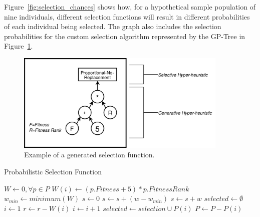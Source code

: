 \documentclass[times,12pt,titlepage]{mstogs}
\begin{document}
\begin{ThesisBody}
Figure~\ref{fig:selection_chances} shows how, for a hypothetical sample population of nine individuals, different selection functions will result in different probabilities of each individual being selected. The graph also includes the selection probabilities for the custom selection algorithm represented by the GP-Tree in Figure~\ref{fig:example_adpsea}. 

\begin{figure}
    \centering
    \includegraphics[width=0.9\textwidth]{example_eppsea}
    \caption{Example of a generated selection function.}
    \label{fig:example_adpsea}
\end{figure}

\begin{algorithm}
\caption{Probabilistic Selection Function}
\label{alg:ExampleSelection}
\begin{algorithmic}[1]
 \label{proc:ExampleSelection}
	\State $W \leftarrow 0,\forall p \in P$
		\State $W(i) \leftarrow (p.Fitness + 5)*p.FitnessRank$
	\EndFor
	\State $w_{min} \leftarrow minimum(W)$	
	\State $s \leftarrow 0$
			\State $s \leftarrow s + (w - w_{min} )$			
		\Else
			\State $s \leftarrow s + w$		
		\EndIf	
	\EndFor
	\State $selected \leftarrow \emptyset$
		\State $i \leftarrow 1$
			\State $r \leftarrow r - W(i)$
			\State $i \leftarrow i + 1$
		\EndWhile	
		\State $selected \leftarrow selection \cup P(i)$
		\State $P \leftarrow P - P(i)$
	\EndFor
\EndProcedure
\end{algorithmic}
\end{algorithm}


\end{ThesisBody}
\end{document}
